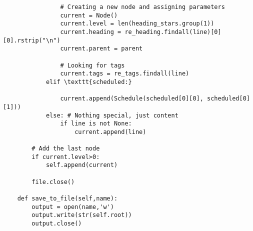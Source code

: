 \documentclass[11pt]{article}
\begin{document}
\begin{verbatim}
                # Creating a new node and assigning parameters
                current = Node() 
                current.level = len(heading_stars.group(1))
                current.heading = re_heading.findall(line)[0][0].rstrip("\n")
                current.parent = parent

                # Looking for tags
                current.tags = re_tags.findall(line)
            elif \texttt{scheduled:}

                current.append(Schedule(scheduled[0][0], scheduled[0][1]))
            else: # Nothing special, just content
                if line is not None:
                    current.append(line)

        # Add the last node
        if current.level>0:
            self.append(current)

        file.close()

    def save_to_file(self,name):
        output = open(name,'w')
        output.write(str(self.root))
        output.close()
\end{verbatim}
\end{document}
